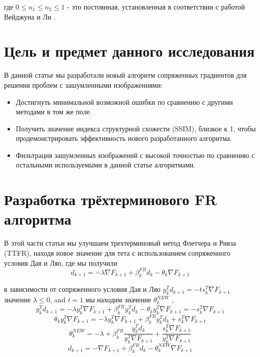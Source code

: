 где $0 \le n_{1} \le n_{2} \le 1 $ - это постоянная, установленная в
соответствии с работой Вейджуна и Ли \cite{art17}.

\section{Цель и предмет данного исследования}

В данной статье мы разработали новый алгоритм сопряженных градиентов для решения
проблем с зашумленными изображениями:

\begin{itemize}
    \item Достигнуть минимальной возможной ошибки по сравнению с другими методами в том же поле.
    \item Получить значение индекса структурной схожести (SSIM), близкое к 1,
        чтобы продемонстрировать эффективность нового разработанного алгоритма.
    \item Фильтрация зашумленных изображений с высокой точностью по сравнению с
        остальными используемыми в данной статье алгоритмами.
\end{itemize}

\section{Разработка трёхтерминового FR алгоритма}

В этой части статьи мы улучшаем трехтерминовый метод Флетчера и Ривза (TTFR),
находя новое значение для тета с использованием сопряженного условия Дая и Ляо,
где мы получили
\begin{equation*}
    d_{k+1}=-\lambda \nabla F_{k+1}+\beta_{k}^{F R}d_{k}-\theta_{k}\nabla F_{k+1}
\end{equation*}

в зависимости от сопряженного условия Дая и Ляо $ y_{k}^{T}d_{k+1}=-t s_{k}^{T}\nabla F_{k+1} $
значение $ \lambda \le 0 $, and $ t = 1 $ мы находим значение $ \theta_{k}^{NEW}$ \cite{art7},
\begin{equation*}
    y_{k}^{T}d_{k+1}=-\lambda y_{k}^{T}\nabla F_{k+1}+\beta_{k}^{F R}y_{k}^{T}d_{k}-\theta_{k}y_{k}^{T}\nabla F_{k+1}=-s_{k}^{T}\nabla F_{k+1}
\end{equation*}
\begin{equation*}
    \theta_{k}y_{k}^{T}\nabla F_{k+1}=-\lambda y_{k}^{T}\nabla F_{k+1}+\beta_{k}^{F R}y_{k}^{T}d_{k}+s_{k}^{T}\nabla F_{k+1}
\end{equation*}
\begin{equation}\label{eqn:eq7}
    \theta_{k}^{N E W}=-\lambda+\beta_{k}^{F R}\frac{y_{k}^{T}d_{k}}{y_{k}^{T}\nabla F_{k+1}}+\frac{s_{k}^{T}\nabla F_{k+1}}{y_{k}^{T}\nabla F_{k+1}}
\end{equation}
\begin{equation}\label{eqn:eq8}
    d_{k+1}=-\nabla F_{k+1}+\beta_{k}^{F R}d_{k}-\theta_{k}^{N E W} \nabla F_{k+1}
\end{equation}


